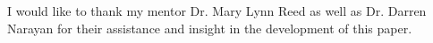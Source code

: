 I would like to thank my mentor Dr. Mary Lynn Reed as well as Dr. Darren Narayan for their assistance and insight in the development of this paper.